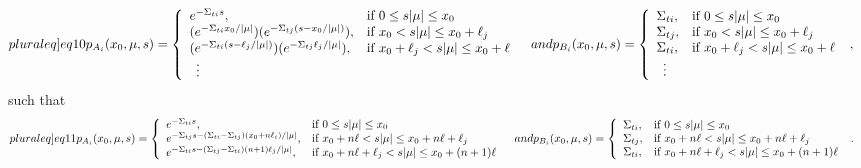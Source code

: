 \documentclass[12pt]{article}
\begin{document}
\begin{subequations}\label[pluraleq]{eq10}
\begin{align}
p_{A_i}(x_0,\mu,s) &=  \left\{
\begin{array}{ll}
e^{-\Sigma_{ti}s}, & \text{if } 0\leq s|\mu|\leq x_0\\
(e^{-\Sigma_{ti}x_0/|\mu|})(e^{-\Sigma_{tj}(s-x_0/|\mu|)}), &\text{if } x_0< s|\mu|\leq x_0+\ell_j\\
(e^{-\Sigma_{ti}(s-\ell_j/|\mu|)})(e^{-\Sigma_{tj}\ell_j/|\mu|}), &\text{if } x_0+\ell_j< s|\mu|\leq x_0+\ell\\
\,\,\,\vdots & 
\end{array}
\right.
\end{align}
and
\begin{align}
p_{B_i}(x_0,\mu,s) &=  \left\{
\begin{array}{ll}
\Sigma_{ti}, & \text{if } 0\leq s|\mu|\leq x_0\\
\Sigma_{tj}, &\text{if } x_0< s|\mu|\leq x_0+\ell_j\\
\Sigma_{ti}, &\text{if } x_0+\ell_j< s|\mu|\leq x_0+\ell\\
\,\,\,\vdots & 
\end{array}
\right.
\,\,,
\end{align}
\end{subequations}
such that
\begin{subequations}\label[pluraleq]{eq11}
\begin{align}
p_{A_i}(x_0,\mu,s) &=  \left\{
\begin{array}{ll}
e^{-\Sigma_{ti}s}, & \text{if } 0\leq s|\mu|\leq x_0  \\
e^{-\Sigma_{tj}s-(\Sigma_{ti}-\Sigma_{tj})(x_0+n\ell_i)/|\mu|}, & \text{if } x_0+n\ell< s|\mu|\leq  x_0+n\ell+\ell_j \\
e^{-\Sigma_{ti}s-(\Sigma_{tj}-\Sigma_{ti})(n+1)\ell_j/|\mu|}, & \text{if } x_0+n\ell+\ell_j< s|\mu|\leq x_0+(n+1)\ell
\end{array}
\right.
\end{align}
and
\begin{align}
p_{B_i}(x_0,\mu,s) &=  \left\{
\begin{array}{ll}
\Sigma_{ti}, & \text{if } 0\leq s|\mu|\leq x_0\\
\Sigma_{tj}, &\text{if } x_0+n\ell< s|\mu|\leq  x_0+n\ell+\ell_j\\
\Sigma_{ti}, &\text{if } x_0+n\ell+\ell_j< s|\mu|\leq x_0+(n+1)\ell
\end{array}
\right.
\,\,.
\end{align}
\end{subequations}
\end{document}
